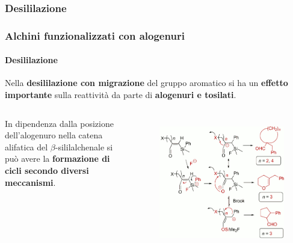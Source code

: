 \subsubsection{Desililazione}\begin{frame}\frametitle{Alchini funzionalizzati con alogenuri}\framesubtitle{Desililazione}
Nella {\bf desililazione con migrazione} del gruppo aromatico si ha un {\bf effetto importante} sulla reattività da parte di {\bf alogenuri e tosilati}.
\begin{columns}


In dipendenza dalla posizione dell'alogenuro nella catena alifatica del $\beta$-sililalchenale si può avere la {\bf formazione di cicli secondo diversi meccanismi}.  
\begin{figure}{\includegraphics[width=1\textwidth]{img/substrati/alogenuri.png}}\end{figure}

\end{columns}
\end{frame}


